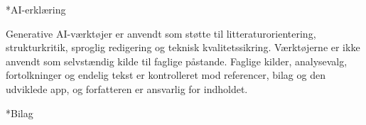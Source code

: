 \documentclass[10pt,a4paper,twoside]{article}
\makeatletter
\newif\iftmappendix
\let\tmoldappendix\appendix
\renewcommand{\appendix}{\tmoldappendix\tmappendixtrue}
\newcommand{\tmheadinglabel}[1]{%
  \iftmappendix
    \MakeUppercase{Bilag}~#1%
  \else
    \MakeUppercase{Kapitel}~#1%
  \fi
}
\newcommand{\tmchapterheading}[2]{%
  \clearpage
  \thispagestyle{plain}%
  \begingroup
  \setlength{\parskip}{0pt}%
  \vspace*{0.8cm}%
  \noindent\hfill{\normalfont\normalsize\tmheadinglabel{#1}}\par
  \vspace{0.8ex}%
  \noindent\rule{\textwidth}{0.4pt}\par
  \vspace{0.45ex}%
  \noindent\hfill{\normalfont\normalsize\bfseries #2}\par
  \vspace{0.45ex}%
  \noindent\rule{\textwidth}{0.4pt}\par
  \endgroup
  \vspace{0.85cm}%
}
\newcommand{\tmplainheading}[1]{%
  \clearpage
  \thispagestyle{plain}%
  \begingroup
  \setlength{\parskip}{0pt}%
  \vspace*{1.4cm}%
  \noindent\rule{\textwidth}{0.4pt}\par
  \vspace{0.45ex}%
  \noindent\hfill{\normalfont\normalsize\bfseries #1}\par
  \vspace{0.45ex}%
  \noindent\rule{\textwidth}{0.4pt}\par
  \endgroup
  \vspace{0.85cm}%
}
\renewcommand\section{%
  \@ifstar{\tmsectionstar}{\tmsectionnumbered}%
}
\newcommand{\tmsectionnumbered}[1]{%
  \refstepcounter{section}%
  \addcontentsline{toc}{section}{\protect\numberline{\thesection}#1}%
  \tmchapterheading{\thesection}{#1}%
}
\newcommand{\tmsectionstar}[1]{%
  \tmplainheading{#1}%
}
\makeatother
\begin{document}














\newpage
{}
{}



\newpage
{}
{}
\section*{AI-erklæring}

Generative AI-værktøjer er anvendt som støtte til litteraturorientering, strukturkritik, sproglig redigering og teknisk kvalitetssikring. Værktøjerne er ikke anvendt som selvstændig kilde til faglige påstande. Faglige kilder, analysevalg, fortolkninger og endelig tekst er kontrolleret mod referencer, bilag og den udviklede app, og forfatteren er ansvarlig for indholdet.

\newpage
\appendix
\makeatletter
{}
\makeatother
\renewcommand{\thefigure}{\thesection.\arabic{figure}}
\renewcommand{\thetable}{\thesection.\arabic{table}}
\section*{Bilag}

\clearpage

\end{document}
